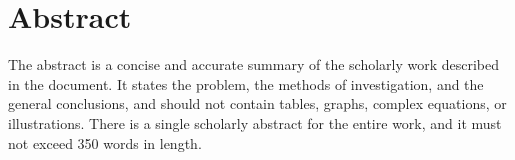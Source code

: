 
\chapter{Abstract}

The abstract is a concise and accurate summary of the scholarly work described in the document. 
It states the problem, the methods of investigation, and the general conclusions, and should not contain tables, graphs, 
complex equations, or illustrations. 
There is a single scholarly abstract for the entire work, and it must not exceed 350 words in length.

